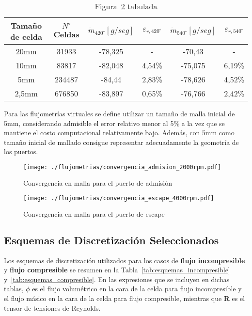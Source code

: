 \begin{table}[h!]  \centering
  \begin{tabular}{cccccc}\toprule
    Tamaño de celda & $N^{\circ}$ Celdas & $\dot{m}_{420^{\circ}} [g/seg]$ & $\varepsilon_{r,420^{\circ}}$ & $\dot{m}_{540^{\circ}} [g/seg]$ & $\varepsilon_{r,540^{\circ}}$ \\ \midrule
    20mm & 31933  & -78,325 & - & -70,43 & - \\
    10mm  & 83817  & -82,048 & 4,54\% & -75,075 & 6,19\% \\
    5mm   & 234487 & -84,44  & 2,83\% & -78,626 & 4,52\% \\
    2,5mm & 676850 & -83,897 & 0,65\% & -76,766 & 2,42\% \\ \bottomrule
  \end{tabular}
  \caption{Figura~\ref{fig:conv_malla_escape} tabulada}\label{tab:convergencia_malla_escape}
\end{table}

Para las flujometrías virtuales se define utilizar un tamaño de malla inicial de
5mm, considerando admisible el error relativo menor al 5\% a la vez que se
mantiene el costo computacional relativamente bajo.
%
Además, con 5mm como tamaño inicial de mallado consigue representar
adecuadamente la geometría de los puertos.

\begin{figure}[h!]  \centering
\texttt{[image: ./flujometrias/convergencia\_admision\_2000rpm.pdf]}
  \caption{Convergencia en malla para el puerto de admisión}\label{fig:conv_malla_admision}
\end{figure}

\begin{figure}[h!]  \centering
\texttt{[image: ./flujometrias/convergencia\_escape\_4000rpm.pdf]}
  \caption{Convergencia en malla para el puerto de escape}\label{fig:conv_malla_escape}
\end{figure}



\subsection{Esquemas de Discretización Seleccionados}

Los esquemas de discretización utilizados para los casos de \textbf{flujo
incompresible} y \textbf{flujo compresible} se resumen en la
Tabla~\ref{tab:esquemas_incompresible} y~\ref{tab:esquemas_compresible}.
%
En las expresiones que se incluyen en dichas tablas, $\phi$ es el flujo
volumétrico en la cara de la celda para flujo incompresible y el flujo másico en
la cara de la celda para flujo compresible, mientras que  \textbf{R} es el
tensor de tensiones de Reynolds.

